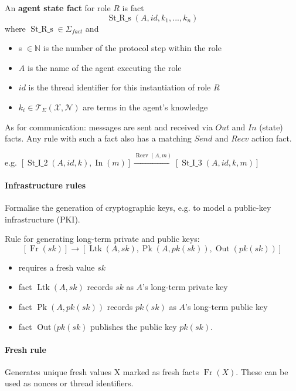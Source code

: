 An \textbf{agent state fact} for role $R$ is fact
$$ \operatorname{St\_R\_s}(A, id, k_1, ... , k_n) $$
where $ \operatorname{St\_R\_s} \in \Sigma_{fact}$ and
\begin{itemize}
    \item s $\in \mathbb{N}$ is the number of the protocol step within the role
    \item $A$ is the name of the agent executing the role
    \item $id$ is the thread identifier for this instantiation of role $R$
    \item $k_i \in \mathcal{T}_\Sigma(\mathcal{X}, \mathcal{N})$ are terms in the agent's knowledge
\end{itemize}

As for communication: messages are sent and received via $Out$ and $In$ (state) facts. Any rule with such a fact also has a matching $Send$ and $Recv$ action fact.

e.g. $[\operatorname{St\_I\_2}(A, id, k), \operatorname{In}(m)] \xrightarrow{\operatorname{Recv}(A,m)} [\operatorname{St\_I\_3}(A, id, k, m)]$

\paragraph{Infrastructure rules} Formalise the generation of cryptographic keys, e.g. to model a public-key infrastructure (PKI).

Rule for generating long-term private and public keys:
$$ [\operatorname{Fr}(sk)] \longrightarrow [\operatorname{Ltk}(A, sk), \operatorname{Pk}(A, pk(sk)), \operatorname{Out}(pk(sk))] $$

\begin{itemize}
    \item requires a fresh value $sk$
    \item fact $\operatorname{Ltk}(A, sk)$ records $sk$ as $A$'s long-term private key
    \item fact $\operatorname{Pk}(A, pk(sk))$ records $pk(sk)$ as $A$'s long-term public key
    \item fact $\operatorname{Out}(pk(sk)$ publishes the public key $pk(sk)$. 
\end{itemize}

\paragraph{Fresh rule} Generates unique fresh values X marked as fresh facts $\operatorname{Fr}(X)$. These can be used as nonces or thread identifiers.

